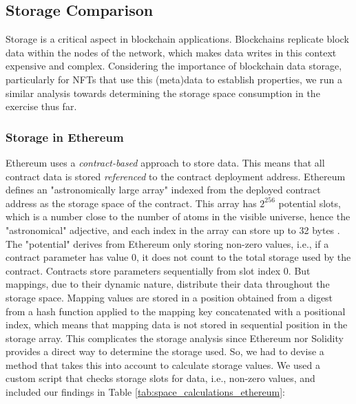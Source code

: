 \documentclass[../NFTComp_IEEE.tex]{subfiles}
\begin{document}
\subsection{Storage Comparison}
Storage is a critical aspect in blockchain applications. Blockchains replicate block data within the nodes of the network, which makes data writes in this context expensive and complex. Considering the importance of blockchain data storage, particularly for NFTs that use this (meta)data to establish properties, we run a similar analysis towards determining the storage space consumption in the exercise thus far.

\subsubsection{Storage in Ethereum}
Ethereum uses a \textit{contract-based} approach to store data. This means that all contract data is stored \textit{referenced} to the contract deployment address. Ethereum defines an "astronomically large array" indexed from the deployed contract address as the storage space of the contract. This array has $ 2^{256} $ potential slots, which is a number close to the number of atoms in the visible universe, hence the "astronomical" adjective, and each index in the array can store up to 32 bytes \cite{Marx2018}. The "potential" derives from Ethereum only storing non-zero values, i.e., if a contract parameter has value 0, it does not count to the total storage used by the contract. Contracts store parameters sequentially from slot index 0. But mappings, due to their dynamic nature, distribute their data throughout the storage space. Mapping values are stored in a position obtained from a digest from a hash function applied to the mapping key concatenated with a positional index, which means that mapping data is not stored in sequential position in the storage array. This complicates the storage analysis since Ethereum nor Solidity provides a direct way to determine the storage used. So, we had to devise a method that takes this into account to calculate storage values. We used a custom script that checks storage slots for data, i.e., non-zero values, and included our findings in Table \ref{tab:space_calculations_ethereum}:
\end{document}
